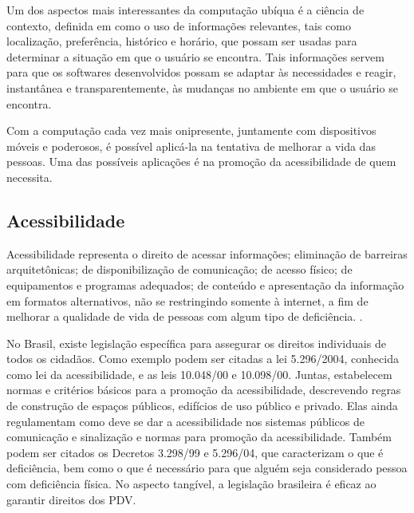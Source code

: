 \documentclass[twoside,english,brazilian]{UNISINOSartigo}
\begin{document}
Um dos aspectos mais interessantes da computação ubíqua é a ciência de contexto, definida em  como o uso de informações relevantes, tais como localização, preferência, histórico e horário, que possam ser usadas para determinar a situação em que o usuário se encontra. Tais informações servem para que os softwares desenvolvidos possam se adaptar às necessidades e reagir, instantânea e transparentemente, às mudanças no ambiente em que o usuário se encontra.

Com a computação cada vez mais onipresente, juntamente com dispositivos móveis e poderosos, é possível aplicá-la na tentativa de melhorar a vida das pessoas. Uma das possíveis aplicações é na promoção da acessibilidade de quem necessita. 

\subsection{Acessibilidade}
Acessibilidade representa o direito de acessar informações; eliminação de barreiras arquitetônicas; de disponibilização de comunicação; de acesso físico; de equipamentos e programas adequados; de conteúdo e apresentação da informação em formatos alternativos, não se restringindo somente à internet, a fim de melhorar a qualidade de vida de pessoas com algum tipo de deficiência. \cite{AcessibilidadeBrasil}. 

No Brasil, existe legislação específica para assegurar os direitos individuais de todos os cidadãos. Como exemplo podem ser citadas a lei 5.296/2004, conhecida como lei da acessibilidade, e as leis 10.048/00 e 10.098/00. Juntas, estabelecem normas e critérios básicos para a promoção da acessibilidade, descrevendo regras de construção de espaços públicos, edifícios de uso público e privado. Elas ainda regulamentam como deve se dar a acessibilidade nos sistemas públicos de comunicação e sinalização e normas para promoção da acessibilidade. Também podem ser citados os Decretos 3.298/99 e 5.296/04, que caracterizam o que é deficiência, bem como o que é necessário para que alguém seja considerado pessoa com deficiência física. No aspecto tangível, a legislação brasileira é eficaz ao garantir direitos dos PDV.
\end{document}
